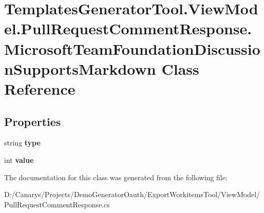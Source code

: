 \hypertarget{class_templates_generator_tool_1_1_view_model_1_1_pull_request_comment_response_1_1_microsoft_te033d878f4bc391c4991265602b9d9ecf}{}\section{Templates\+Generator\+Tool.\+View\+Model.\+Pull\+Request\+Comment\+Response.\+Microsoft\+Team\+Foundation\+Discussion\+Supports\+Markdown Class Reference}
\label{class_templates_generator_tool_1_1_view_model_1_1_pull_request_comment_response_1_1_microsoft_te033d878f4bc391c4991265602b9d9ecf}
\subsection*{Properties}
\begin{DoxyCompactItemize}
\item 
\mbox{\label{class_templates_generator_tool_1_1_view_model_1_1_pull_request_comment_response_1_1_microsoft_te033d878f4bc391c4991265602b9d9ecf_a36f728121e203dba3939822f874cfc02}} 
string {\bfseries type}
\item 
\mbox{\label{class_templates_generator_tool_1_1_view_model_1_1_pull_request_comment_response_1_1_microsoft_te033d878f4bc391c4991265602b9d9ecf_a1162c447fca5f950f03b5de08aa58db3}} 
int {\bfseries value}
\end{DoxyCompactItemize}


The documentation for this class was generated from the following file\+:\begin{DoxyCompactItemize}
\item 
D\+:/\+Canarys/\+Projects/\+Demo\+Generator\+Oauth/\+Export\+Workitems\+Tool/\+View\+Model/Pull\+Request\+Comment\+Response.\+cs\end{DoxyCompactItemize}
